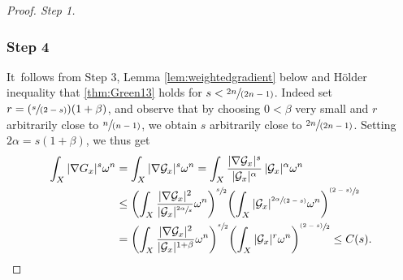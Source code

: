 \documentclass[JEP,XML,SOM,Unicode,published]{cedram}
\newcommand{\Pspfrac}[2]{(\sfrac{#1}{(#2)})}
\newcommand{\psfrac}[2]{\sfrac{(#1)}{#2}}
\newcommand{\spfrac}[2]{\sfrac{#1}{(#2)}}
\theoremstyle{definition}
\begin{document}
\begin{proof}[Proof. Step 1]
\subsubsection*{Step 4}
It~follows from Step 3, Lemma \ref{lem:weightedgradient} below and Hölder inequality
that \eqref{thm:Green13} holds for $s<\spfrac{2n}{2n-1}$.
Indeed set $r=\Pspfrac{s}{2-s}(1+\beta)$, and observe that
by choosing $0<\beta$ very small and $r$ arbitrarily close to $\spfrac{n}{n-1}$,
we obtain $s$ arbitrarily close to $\spfrac{2n}{2n-1}$.
Setting $2\alpha=s(1+\beta)$, we thus get
\begin{align*}
\int_X |\nabla {G}_x|^s {\omega^n}&=
\int_X |\nabla {\mathcal G}_x|^s {\omega^n}
= \int_X \frac{|\nabla {\mathcal G}_x|^s}{|{\mathcal G}_x|^{\alpha}}\, |{\mathcal G}_x|^{\alpha} {\omega^n} \\
&\leq  \left( \int_X \frac{|\nabla {\mathcal G}_x|^2}{{|{\mathcal G}_x}|^{\sfrac{2\alpha}{s}}} {\omega^n} \right)^{\sfrac{s}{2}}
\!\left( \int_X |{\mathcal G}_x|^{\spfrac{2\alpha}{2-s}} {\omega^n} \right)^{\psfrac{2-s}{2}} \\
&= \left( \int_X \frac{|\nabla {\mathcal G}_x|^2}{{|{\mathcal G}_x}|^{1+\beta}} {\omega^n} \right)^{\sfrac{s}{2}}
\!\left( \int_X |{\mathcal G}_x|^{r} {\omega^n} \right)^{\psfrac{2-s}{2}} \leq C(s).\qedhere
\end{align*}
\end{proof}
\end{document}
